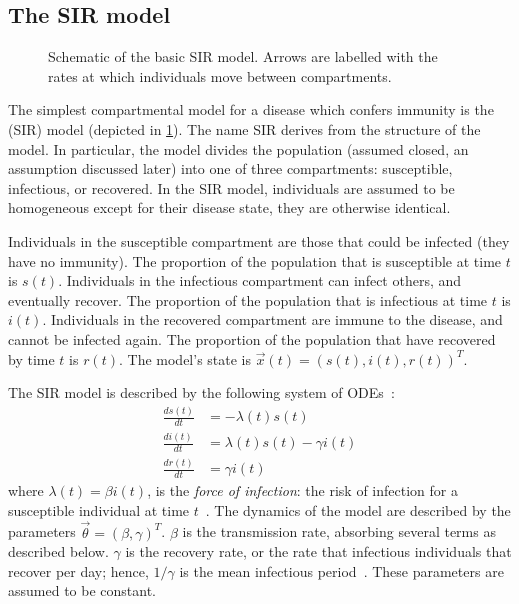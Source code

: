 \documentclass[thesis.tex]{subfiles}
\begin{document}
\subsection{The SIR model} \label{SEIR:sec:SIR}

\begin{figure}[h]
  \caption[The SIR model]{Schematic of the basic SIR model. Arrows are labelled with the rates at which individuals move between compartments.}
  \label{SEIR:fig:SIR}
\end{figure}

The simplest compartmental model for a disease which confers immunity is the (SIR) model (depicted in \cref{SEIR:fig:SIR}).
The name SIR derives from the structure of the model.
In particular, the model divides the population (assumed closed, an assumption discussed later) into one of three compartments: susceptible, infectious, or recovered.
In the SIR model, individuals are assumed to be homogeneous except for their disease state, \ie they are otherwise identical.

Individuals in the susceptible compartment are those that could be infected (they have no immunity).
The proportion of the population that is susceptible at time $t$ is $s(t)$.
Individuals in the infectious compartment can infect others, and eventually recover.
The proportion of the population that is infectious at time $t$ is $i(t)$.
Individuals in the recovered compartment are immune to the disease, and cannot be infected again.
The proportion of the population that have recovered by time $t$ is $r(t)$.
The model's state is $\vec{x}(t) = (s(t), i(t), r(t))^T$.

The SIR model is described by the following system of ODEs~\autocite[19]{keelingModeling}:
\begin{align}
\frac{ds(t)}{dt} &= -\lambda(t) s(t) \\
\frac{di(t)}{dt} &= \lambda(t) s(t) - \gamma i(t) \\
\frac{dr(t)}{dt} &= \gamma i(t)
\end{align}
where $\lambda(t) = \beta i(t)$, is the \emph{force of infection}: the risk of infection for a susceptible individual at time $t$~\autocite[17]{keelingModeling}.
The dynamics of the model are described by the parameters $\vec{\theta} = (\beta, \gamma)^T$.
$\beta$ is the transmission rate, absorbing several terms as described below.
$\gamma$ is the recovery rate, or the rate that infectious individuals that recover per day; hence, $1/\gamma$ is the mean infectious period~\autocite[367]{keelingModeling}.
These parameters are assumed to be constant.
\end{document}

